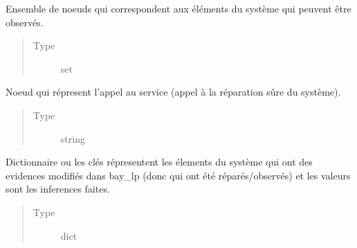 \documentclass[letterpaper,10pt,french]{sphinxmanual}
\begin{document}
\begin{fulllineitems}
\begin{fulllineitems}
\begin{quote}
\begin{description}
\end{description}\end{quote}

\end{fulllineitems}


\begin{fulllineitems}
\label{\detokenize{index:DecisionTheoreticTroubleshooting.TroubleShootingProblem.observation_nodes}}
Ensemble de noeuds qui correspondent aux éléments
du système qui peuvent être observés.
\begin{quote}\begin{description}
\item[{Type}] \leavevmode
set

\end{description}\end{quote}

\end{fulllineitems}


\begin{fulllineitems}
\label{\detokenize{index:DecisionTheoreticTroubleshooting.TroubleShootingProblem.service_node}}
Noeud qui répresent l’appel au service (appel à la
réparation sûre du système).
\begin{quote}\begin{description}
\item[{Type}] \leavevmode
string

\end{description}\end{quote}

\end{fulllineitems}


\begin{fulllineitems}
\label{\detokenize{index:DecisionTheoreticTroubleshooting.TroubleShootingProblem.evidences}}
Dictionnaire ou les clés répresentent les élements du
système qui ont des evidences modifiés dans bay\_lp (donc qui ont
été réparés/observés) et les valeurs sont les inferences faites.
\begin{quote}\begin{description}
\item[{Type}] \leavevmode
dict


\end{description}
\end{quote}
\end{fulllineitems}
\end{fulllineitems}
\end{document}

